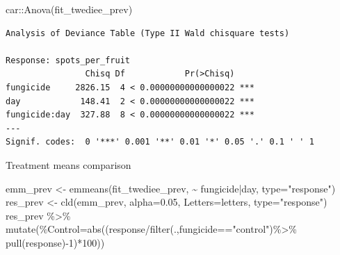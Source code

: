 \documentclass[
  letterpaper,
  DIV=11,
  numbers=noendperiod]{scrreport}
\newenvironment{Shaded}{\begin{snugshade}}{\end{snugshade}}
\newcommand{\AttributeTok}[1]{\textcolor[rgb]{0.40,0.45,0.13}{#1}}
\newcommand{\DecValTok}[1]{\textcolor[rgb]{0.68,0.00,0.00}{#1}}
\newcommand{\FloatTok}[1]{\textcolor[rgb]{0.68,0.00,0.00}{#1}}
\newcommand{\FunctionTok}[1]{\textcolor[rgb]{0.28,0.35,0.67}{#1}}
\newcommand{\NormalTok}[1]{\textcolor[rgb]{0.00,0.23,0.31}{#1}}
\newcommand{\OtherTok}[1]{\textcolor[rgb]{0.00,0.23,0.31}{#1}}
\newcommand{\SpecialCharTok}[1]{\textcolor[rgb]{0.37,0.37,0.37}{#1}}
\newcommand{\StringTok}[1]{\textcolor[rgb]{0.13,0.47,0.30}{#1}}
\begin{document}
\begin{Shaded}
\begin{Highlighting}[]
\NormalTok{car}\SpecialCharTok{::}\FunctionTok{Anova}\NormalTok{(fit\_twediee\_prev)}
\end{Highlighting}
\end{Shaded}

\begin{verbatim}
Analysis of Deviance Table (Type II Wald chisquare tests)

Response: spots_per_fruit
                Chisq Df            Pr(>Chisq)    
fungicide     2826.15  4 < 0.00000000000000022 ***
day            148.41  2 < 0.00000000000000022 ***
fungicide:day  327.88  8 < 0.00000000000000022 ***
---
Signif. codes:  0 '***' 0.001 '**' 0.01 '*' 0.05 '.' 0.1 ' ' 1
\end{verbatim}

Treatment means comparison

\begin{Shaded}
\begin{Highlighting}[]
\NormalTok{emm\_prev }\OtherTok{\textless{}{-}} \FunctionTok{emmeans}\NormalTok{(fit\_twediee\_prev, }\SpecialCharTok{\textasciitilde{}}\NormalTok{ fungicide}\SpecialCharTok{|}\NormalTok{day, }\AttributeTok{type=}\StringTok{"response"}\NormalTok{) }
\NormalTok{res\_prev }\OtherTok{\textless{}{-}} \FunctionTok{cld}\NormalTok{(emm\_prev, }\AttributeTok{alpha=}\FloatTok{0.05}\NormalTok{, }\AttributeTok{Letters=}\NormalTok{letters,  }\AttributeTok{type=}\StringTok{"response"}\NormalTok{)}
\NormalTok{res\_prev }\SpecialCharTok{\%\textgreater{}\%} 
   \FunctionTok{mutate}\NormalTok{(}\StringTok{\textasciigrave{}}\AttributeTok{\%Control}\StringTok{\textasciigrave{}}\OtherTok{=}\FunctionTok{abs}\NormalTok{((response}\SpecialCharTok{/}\FunctionTok{filter}\NormalTok{(.,fungicide}\SpecialCharTok{==}\StringTok{"control"}\NormalTok{)}\SpecialCharTok{\%\textgreater{}\%} \FunctionTok{pull}\NormalTok{(response)}\SpecialCharTok{{-}}\DecValTok{1}\NormalTok{)}\SpecialCharTok{*}\DecValTok{100}\NormalTok{)) }
\end{Highlighting}
\end{Shaded}
\end{document}
